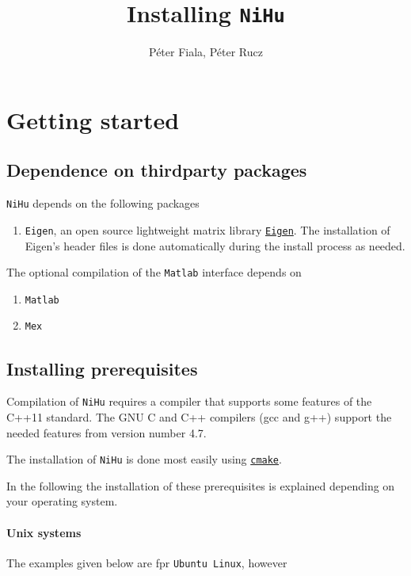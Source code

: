 \documentclass[a4paper,10pt]{article}
\title{Installing \texttt{NiHu}}
\author{Péter Fiala, Péter Rucz}
\begin{document}
\maketitle

\section{Getting started}

\subsection{Dependence on thirdparty packages}

\texttt{NiHu} depends on the following packages

\begin{enumerate}
	\item \texttt{Eigen}, an open source lightweight matrix library \href{http://eigen.tuxfamily.org}{\texttt{Eigen}}. The installation of Eigen's header files is done automatically during the install process as needed.
\end{enumerate}

The optional compilation of the \texttt{Matlab} interface depends on

\begin{enumerate}
	\item \texttt{Matlab}
	\item \texttt{Mex}
\end{enumerate}

\subsection{Installing prerequisites}

Compilation of \texttt{NiHu} requires a compiler that supports some features of the C++11 standard. The GNU C and C++ compilers (gcc and g++) support the needed features from version number 4.7.

The installation of \texttt{NiHu} is done most easily using \href{http://cmake.org}{\texttt{cmake}}. 

In the following the installation of these prerequisites is explained depending on your operating system.

\paragraph{Unix systems}

The examples given below are fpr \texttt{Ubuntu Linux}, however
\end{document}
